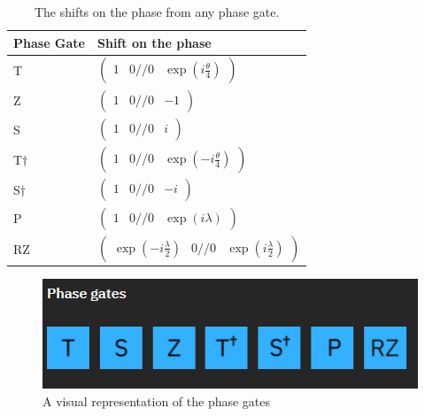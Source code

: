 \begin{table}[]
\label{tab:gates}
    \begin{tabular}{l|l}
    \hline
    \multicolumn{1}{|l|}{Phase Gate}  & \multicolumn{1}{l|}{Shift on the phase}                            \\ \hline
    T                                 & $\begin{pmatrix}1&0// 0& \exp(i\frac{\theta}{4})\end{pmatrix}$     \\
    Z                                 & $\begin{pmatrix}1&0//0& -1\end{pmatrix}$                           \\
    S                                 & $\begin{pmatrix}1&0//0& i\end{pmatrix}$                            \\
    T$\dagger$                        & $\begin{pmatrix}1&0//0& \exp(-i\frac{\theta}{4})\end{pmatrix}$     \\
    S$\dagger $                       & $\begin{pmatrix}1&0//0& -i\end{pmatrix}$                           \\
    P                                 & $\begin{pmatrix}1&0//0& \exp(i\lambda)\end{pmatrix}$               \\
    RZ                                & $\begin{pmatrix}\exp(-i\frac{\lambda}{2})&0//0& \exp(i\frac{\lambda}{2})\end{pmatrix}$                                    
    \end{tabular}
    \caption{The shifts on the phase from any phase gate.}
\end{table}

\begin{figure} [h]
    \centering
    \includegraphics[width=\textwidth]{img/phase-gates.PNG}
        \caption{A visual representation of the phase gates}
        \label{fig:phase gates}
\end{figure}


